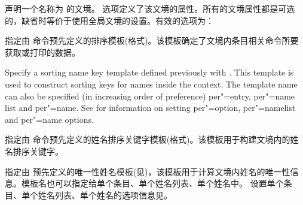 \begin{ltxsyntax}


声明一个名称为  的文境。 选项定义了该文境的属性。所有的文境属性都是可选的，缺省时等价于使用全局文境的设置。有效的选项为：

\begin{optionlist*}


指定由  命令预先定义的排序模板(格式)。该模板确定了文境内条目相关命令所要获取或打印的数据。



Specify a sorting name key template defined previously with . This template is used to construct sorting keys for names inside the context. The template name can also be specified (in increasing order of preference) per"=entry, per"=name list and per"=name. See  for information on setting per"=option, per"=namelist and per"=name options.


指定由  命令预先定义的姓名排序关键字模板(格式)。该模板用于构建文境内的姓名排序关键字。


指定由  预先定义的唯一性姓名模板(见)，该模板用于计算文境内姓名的唯一性信息。模板名也可以指定给单个条目、单个姓名列表、单个姓名中。
设置单个条目、单个姓名列表、单个姓名的选项信息见。


\end{optionlist*}
\end{ltxsyntax}
